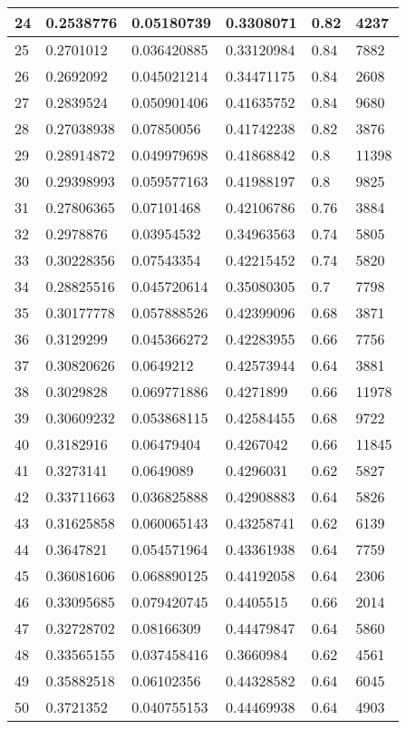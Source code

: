 \begin{longtable}{|l|l|l|l|l|l|}
24 & 0.2538776 & 0.05180739 & 0.3308071 & 0.82 & 4237 \\ \hline 
25 & 0.2701012 & 0.036420885 & 0.33120984 & 0.84 & 7882 \\ \hline 
26 & 0.2692092 & 0.045021214 & 0.34471175 & 0.84 & 2608 \\ \hline 
27 & 0.2839524 & 0.050901406 & 0.41635752 & 0.84 & 9680 \\ \hline 
28 & 0.27038938 & 0.07850056 & 0.41742238 & 0.82 & 3876 \\ \hline 
29 & 0.28914872 & 0.049979698 & 0.41868842 & 0.8 & 11398 \\ \hline 
30 & 0.29398993 & 0.059577163 & 0.41988197 & 0.8 & 9825 \\ \hline 
31 & 0.27806365 & 0.07101468 & 0.42106786 & 0.76 & 3884 \\ \hline 
32 & 0.2978876 & 0.03954532 & 0.34963563 & 0.74 & 5805 \\ \hline 
33 & 0.30228356 & 0.07543354 & 0.42215452 & 0.74 & 5820 \\ \hline 
34 & 0.28825516 & 0.045720614 & 0.35080305 & 0.7 & 7798 \\ \hline 
35 & 0.30177778 & 0.057888526 & 0.42399096 & 0.68 & 3871 \\ \hline 
36 & 0.3129299 & 0.045366272 & 0.42283955 & 0.66 & 7756 \\ \hline 
37 & 0.30820626 & 0.0649212 & 0.42573944 & 0.64 & 3881 \\ \hline 
38 & 0.3029828 & 0.069771886 & 0.4271899 & 0.66 & 11978 \\ \hline 
39 & 0.30609232 & 0.053868115 & 0.42584455 & 0.68 & 9722 \\ \hline 
40 & 0.3182916 & 0.06479404 & 0.4267042 & 0.66 & 11845 \\ \hline 
41 & 0.3273141 & 0.0649089 & 0.4296031 & 0.62 & 5827 \\ \hline 
42 & 0.33711663 & 0.036825888 & 0.42908883 & 0.64 & 5826 \\ \hline 
43 & 0.31625858 & 0.060065143 & 0.43258741 & 0.62 & 6139 \\ \hline 
44 & 0.3647821 & 0.054571964 & 0.43361938 & 0.64 & 7759 \\ \hline 
45 & 0.36081606 & 0.068890125 & 0.44192058 & 0.64 & 2306 \\ \hline 
46 & 0.33095685 & 0.079420745 & 0.4405515 & 0.66 & 2014 \\ \hline 
47 & 0.32728702 & 0.08166309 & 0.44479847 & 0.64 & 5860 \\ \hline 
48 & 0.33565155 & 0.037458416 & 0.3660984 & 0.62 & 4561 \\ \hline 
49 & 0.35882518 & 0.06102356 & 0.44328582 & 0.64 & 6045 \\ \hline 
50 & 0.3721352 & 0.040755153 & 0.44469938 & 0.64 & 4903 \\ \hline 
\end{longtable}